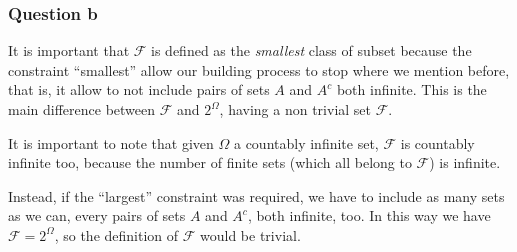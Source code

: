 

\subsubsection{Question b}
It is important that $\mathcal{F}$ is defined as the \emph{smallest}
class of subset because the constraint ``smallest'' allow our building
process to stop where we mention before, that is, it allow to not
include pairs of sets $A$ and $A^c$ both infinite. This is the main
difference between $\mathcal{F}$ and $2^\Omega$, having a non trivial
set $\mathcal{F}$.

It is important to note that given $\Omega$ a countably infinite set,
$\mathcal{F}$ is countably infinite too, because the number of finite
sets (which all belong to $\mathcal{F}$) is infinite.

Instead, if the ``largest'' constraint was required, we have to
include as many sets as we can, every pairs of sets $A$ and $A^c$,
both infinite, too. In this way we have $\mathcal{F} = 2^\Omega$, so
the definition of $\mathcal{F}$ would be trivial.

